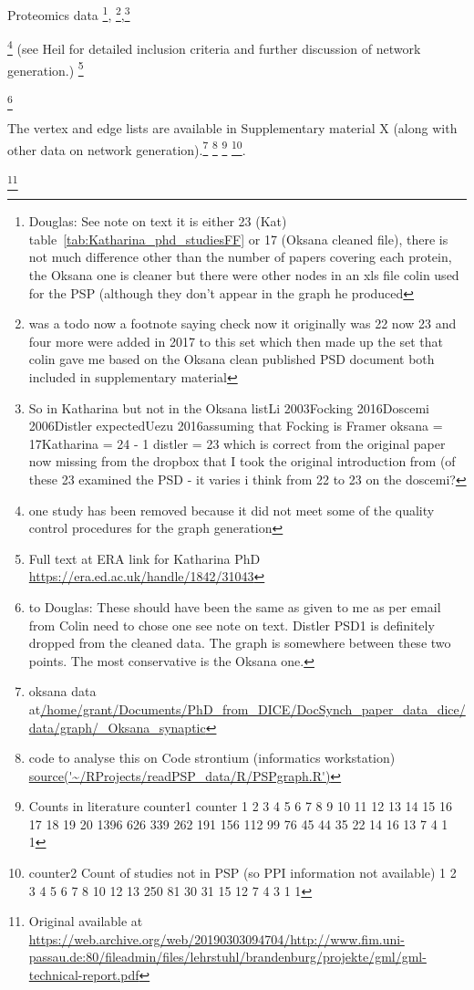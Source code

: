 Proteomics data
\footnote{Douglas: See note on text it is either 23 (Kat) table~\ref{tab:Katharina_phd_studiesFF} or 17 (Oksana cleaned file), there is not much difference other than the number of papers covering each protein, the Oksana one is cleaner but there were other nodes in an xls file colin used for the PSP (although they don't appear in the graph he produced}, \footnote{was a todo now a footnote saying check now it originally was 22 now 23 and four more were added in 2017 to this set which then made up the set that colin gave me based on the Oksana clean published PSD document both included in supplementary material},\footnote{So in Katharina but not in the Oksana listLi 2003Focking 2016Doscemi 2006Distler expectedUezu 2016assuming that Focking is Framer  oksana = 17Katharina = 24 - 1 distler = 23 which is correct from the original paper now missing from the dropbox that I took the original introduction from (of these 23 examined the PSD - it varies i think from 22 to 23 on the doscemi?}

 \footnote{one study has been removed because it did not meet some of the quality control procedures for the graph generation} (see Heil \cite{heil2018systems} for detailed inclusion criteria and further discussion of network generation.)
\footnote{Full text at  ERA link for Katharina PhD \url{https://era.ed.ac.uk/handle/1842/31043}} 

\footnote{to Douglas: These should have been the same as given to me as per email from Colin need to chose one see note on text. Distler PSD1 is definitely dropped from the cleaned data. The graph is somewhere between these two points. The most conservative is the Oksana one.}


The vertex and edge lists are available in Supplementary material X (along with other data on network generation).\footnote{oksana data at\url{/home/grant/Documents/PhD_from_DICE/DocSynch_paper_data_dice/data/graph/_Oksana_synaptic}}
\footnote{code to analyse this on Code strontium (informatics workstation) \url{source('~/RProjects/readPSP_data/R/PSPgraph.R')}} \footnote{Counts in literature counter1
counter
   1    2    3    4    5    6    7    8    9   10   11   12   13   14   15   16   17   18   19   20 
1396  626  339  262  191  156  112   99   76   45   44   35   22   14   16   13    7    4    1    1 }
\footnote{counter2 Count of studies not in PSP (so PPI information not available)
  1   2   3   4   5   6   7   8  10  12  13 
250  81  30  31  15  12   7   4   3   1   1 }. 

\footnote{Original available at \url{https://web.archive.org/web/20190303094704/http://www.fim.uni-passau.de:80/fileadmin/files/lehrstuhl/brandenburg/projekte/gml/gml-technical-report.pdf}}



